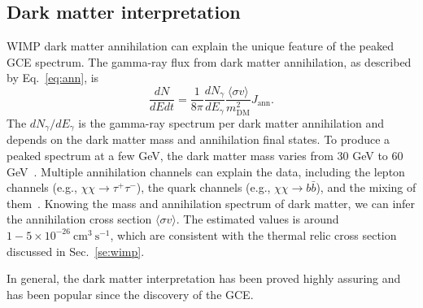 \documentclass[doublespace,nopageskip]{VTthesis} %
\newcommand{\sigmav}{\langle\sigma v\rangle}
\begin{document}
\subsection{Dark matter interpretation}

WIMP dark matter annihilation can explain the unique feature of the peaked GCE spectrum. 
The gamma-ray flux from dark matter annihilation, as described by Eq.~\ref{eq:ann}, is
\begin{equation}
    \frac{dN}{dEdt} = \frac{1}{8\pi}\frac{dN_\gamma}{dE_\gamma}\frac{\sigmav}{m_\mathrm{DM}^2}J_\mathrm{ann}.
\end{equation}
The $dN_\gamma/dE_\gamma$ is the gamma-ray spectrum per dark matter annihilation and depends on the dark matter mass and annihilation final states. To produce a peaked spectrum at a few GeV, the dark matter mass varies from 30 GeV to 60 GeV~\cite{2011PhRvD..84l3005H, 2012PhRvD..86h3511A,2013PhRvD..88h3521G,2016PDU....12....1D,2015JCAP...03..038C}. Multiple annihilation channels can explain the data, including the lepton channels (e.g., $\chi\chi\to\tau^+\tau^-$), the quark channels (e.g., $\chi\chi\to b\bar{b}$), and the mixing of them~\cite{2011PhRvD..84l3005H, 2012PhRvD..86h3511A,2013PhRvD..88h3521G,2016PDU....12....1D,2015JCAP...03..038C}. Knowing the mass and annihilation spectrum of dark matter, we can infer the annihilation cross section $\sigmav$. The estimated values is around $1 - 5 \times 10^{-26}\ \mathrm{cm}^3\  \mathrm{s}^{-1}$, which are consistent with the thermal relic cross section discussed in Sec.~\ref{se:wimp}.

In general, the dark matter interpretation has been proved highly assuring and has been popular since the discovery of the GCE.





\end{document}
